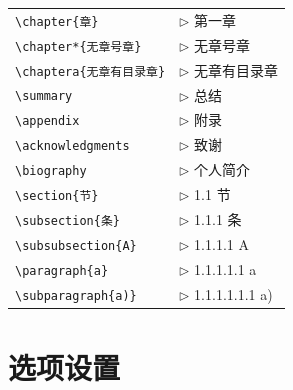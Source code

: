 \begin{tabular}{ll}
  \verb|\chapter{章}|              & $\triangleright$ 第一章 \\
  \verb|\chapter*{无章号章}|       & $\triangleright$ 无章号章 \\
  \verb|\chaptera{无章有目录章}|   & $\triangleright$ 无章有目录章 \\
  \verb|\summary|                  & $\triangleright$ 总结\\
  \verb|\appendix|                 & $\triangleright$ 附录\\
  \verb|\acknowledgments|          & $\triangleright$ 致谢\\
  \verb|\biography|                & $\triangleright$ 个人简介\\
  \verb|\section{节}|              & $\triangleright$ 1.1 节\\
  \verb|\subsection{条}|           & $\triangleright$ 1.1.1 条\\
  \verb|\subsubsection{A}|         & $\triangleright$ 1.1.1.1 A\\
  \verb|\paragraph{a}|             & $\triangleright$ 1.1.1.1.1 a\\
  \verb|\subparagraph{a)}|         & $\triangleright$ 1.1.1.1.1.1 a)\\
\end{tabular}

\section{选项设置}

